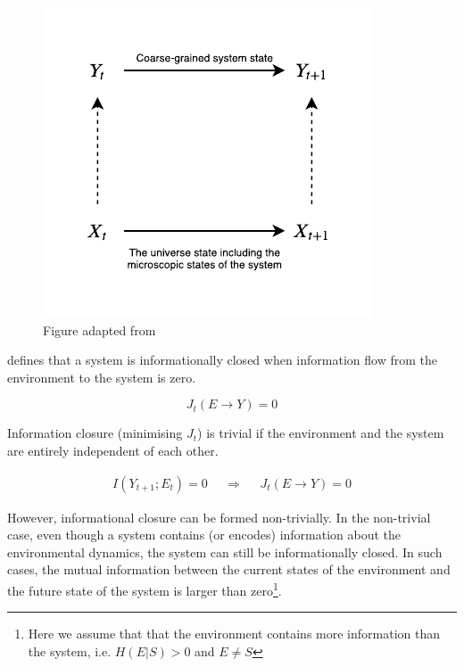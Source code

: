 \documentclass[utf8]{article}
\begin{document}
            
				\begin{figure}
					\includegraphics[width=\textwidth]{WritingMaterials/Fig_SystemAndEnv/SystemAndUniv.pdf}
					\caption{Figure adapted from \cite{BERTSCHINGER.2006}}
					\label{fig:SystemAndUniverse}
				\end{figure}


			\noindent
			\cite{BERTSCHINGER.2006} defines that a system is informationally closed when information flow from the environment to the system is zero.

				\begin{equation}
				J_{t}(E \rightarrow Y )=0
				\end{equation}


			\noindent
			Information closure (minimising $J_t$) is trivial if the environment and the system are entirely independent of each other.

				\begin{equation}
				\begin{aligned}
				{I(Y_{t+1};E_{t})=0}&&{\Rightarrow}&&{J_{t}(E \rightarrow Y )=0}
				\end{aligned}
				\end{equation}


			\noindent
			However, informational closure can be formed non-trivially. In the non-trivial case, even though a system contains (or encodes) information about the environmental dynamics, the system can still be informationally closed. In such cases, the mutual information between the current states of the environment and the future state of the system is larger than zero\footnote{Here we assume that that the environment contains more information than the system, i.e. $H(E|S)>0$ and $E\neq S$}. 
\end{document}
